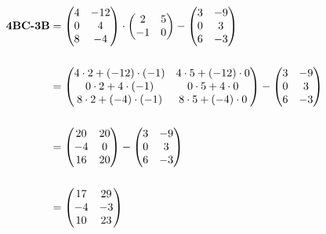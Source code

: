 \documentclass{tufte-handout}
\begin{document}
\begin{question}
\vspace{3cm}

    \qsubpart

    \begin{align*}
    \textbf{4BC-3B}
    &=
        \begin{pmatrix}
            4 & -12\\
            0 & 4\\
            8 & -4
        \end{pmatrix}
        \cdot{
            \begin{pmatrix}
                2 & 5\\
                -1 & 0
            \end{pmatrix}
        }
        -
        \begin{pmatrix}
            3 & -9\\
            0 & 3\\
            6 & -3
        \end{pmatrix}\\[15pt]
    &=
        \begin{pmatrix}
            4\cdot{2}+(-12)\cdot{(-1)} & 4\cdot{5}+\left(-12\right)\cdot{0}\\
            0\cdot{2}+4\cdot{ \left(-1\right) } & 0\cdot{5}+4\cdot{0}\\
            8\cdot{2}+\left(-4\right)\cdot{ \left(-1\right) } & 8\cdot{5}+\left(-4\right)\cdot{0}
        \end{pmatrix}
        -
        \begin{pmatrix}
            3 & -9\\
            0 & 3\\
            6 & -3
        \end{pmatrix}\\[15pt]
    &=
        \begin{pmatrix}
            20 & 20\\
            -4 & 0\\
            16 & 20
        \end{pmatrix}
        -
        \begin{pmatrix}
            3 & -9\\
            0 & 3\\
            6 & -3
        \end{pmatrix}\\[15pt]
    &=
        \begin{pmatrix}
            17 & 29\\
            -4 & -3\\
            10 & 23
        \end{pmatrix}
    \end{align*}


\end{question}
\end{document}
